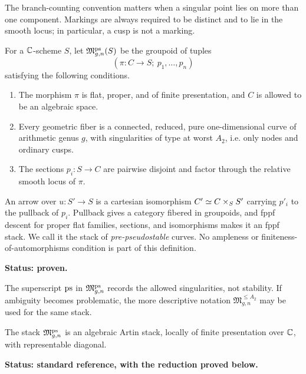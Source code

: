 \documentclass[12pt]{memoir}
\begin{document}
The branch-counting convention matters when a singular point lies on more
than one component.  Markings are always required to be distinct and to lie
in the smooth locus; in particular, a cusp is not a marking.

\begin{Def}
    \label{def-pre-pseudostable-stack}
    For a \(\mathbb{C}\)-scheme \(S\), let \(\mathfrak M^{\operatorname{\mathrm{ps}}}_{g,n}(S)\) be the
    groupoid of tuples
    \[
        (\pi\colon C\to S;\ p_1,\ldots,p_n)
    \]
    satisfying the following conditions.
    \begin{enumerate}
        \item The morphism \(\pi\) is flat, proper, and of finite
        presentation, and \(C\) is allowed to be an algebraic space.
        \item Every geometric fiber is a connected, reduced, pure
        one-dimensional curve of arithmetic genus \(g\), with singularities
        of type at worst \(A_2\), i.e. only nodes and ordinary cusps.
        \item The sections \(p_i\colon S\to C\) are pairwise disjoint and
        factor through the relative smooth locus of \(\pi\).
    \end{enumerate}
    An arrow over \(u\colon S'\to S\) is a cartesian isomorphism
    \(C'\simeq C\times_S S'\) carrying \(p'_i\) to the pullback of \(p_i\).
    Pullback gives a category fibered in groupoids, and fppf descent for
    proper flat families, sections, and isomorphisms makes it an fppf stack.
    We call it the stack of \emph{pre-pseudostable} curves.  No ampleness or
    finiteness-of-automorphisms condition is part of this definition.

    \noindent\textbf{Status: proven.}
\end{Def}

The superscript \(\operatorname{\mathrm{ps}}\) in \(\mathfrak M^{\operatorname{\mathrm{ps}}}_{g,n}\) records the allowed
singularities, not stability.  If ambiguity becomes problematic, the more
descriptive notation \(\mathfrak M^{\leq A_2}_{g,n}\) may be used for the
same stack.

\begin{Prop}[Algebraicity]
    \label{prop-pre-ps-algebraic}
    The stack \(\mathfrak M^{\operatorname{\mathrm{ps}}}_{g,n}\) is an algebraic Artin stack, locally
    of finite presentation over \(\mathbb{C}\), with representable diagonal.

    \noindent\textbf{Status: standard reference, with the reduction proved
    below.}
\end{Prop}
\end{document}
